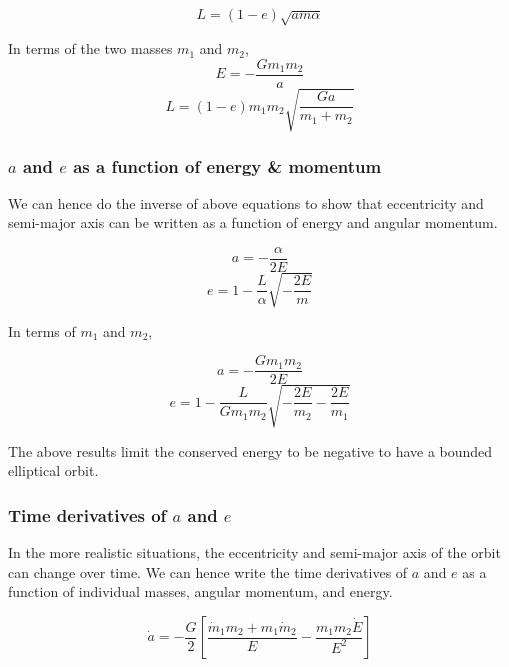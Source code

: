 \documentclass{article}
\begin{document}
\begin{equation}
    L = (1-e) \sqrt{am\alpha}
\end{equation}

In terms of the two masses $m_1$ and $m_2$,
\begin{equation}
    E = -\frac{Gm_1 m_2}{a}
\end{equation}
\begin{equation}
    L = (1-e) m_1 m_2 \sqrt{\frac{Ga}{m_1+m_2}}
\end{equation}

\subsubsection{$a$ and $e$ as a function of energy \& momentum}
We can hence do the inverse of above equations to show that eccentricity and semi-major axis can be written as a function of energy and angular momentum.

\begin{equation}
    a = - \frac{\alpha}{2E}
\end{equation}
\begin{equation}
    e = 1- \frac{L}{\alpha}\sqrt{-\frac{2E}{m}}
\end{equation}

In terms of $m_1$ and $m_2$,

\begin{equation}
    a = - \frac{Gm_1 m_2}{2E}
\end{equation}
\begin{equation}
    e = 1- \frac{L}{Gm_1 m_2} \sqrt{- \frac{2E}{m_2} - \frac{2E}{m_1}}
\end{equation}

The above results limit the conserved energy to be negative to have a bounded elliptical orbit.

\subsubsection{Time derivatives of $a$ and $e$}
In the more realistic situations, the eccentricity and semi-major axis of the orbit can change over time. We can hence write the time derivatives of $a$ and $e$ as a function of individual masses, 
angular momentum, and energy.

\begin{equation}
    \dot{a} = -\frac{G}{2} \left[\frac{\dot m_1 m_2 + m_1 \dot m_2}{E} - \frac{m_1m_2 \dot E}{E^2}\right]
\end{equation}
\end{document}
